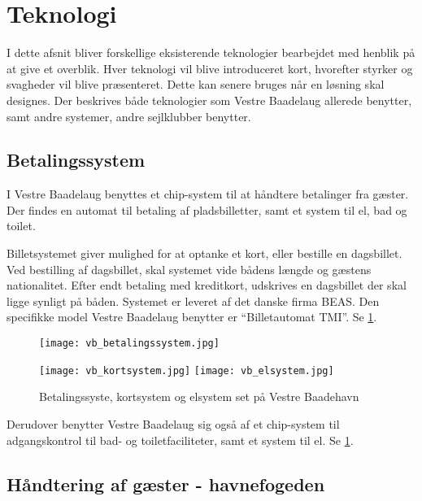 \section{Teknologi} %
\label{sec:Teknologi}

I dette afsnit bliver forskellige eksisterende teknologier bearbejdet med henblik på at give et overblik. Hver teknologi vil blive introduceret kort, hvorefter styrker og svagheder vil blive præsenteret. Dette kan senere bruges når en løsning skal designes. Der beskrives både teknologier som Vestre Baadelaug allerede benytter, samt andre systemer, andre sejlklubber benytter. 

\subsection{Betalingssystem} %
\label{sub:tek_betaling}

I Vestre Baadelaug benyttes et chip-system til at håndtere betalinger fra gæster. Der findes en automat til betaling af pladsbilletter, samt et system til el, bad og toilet.

Billetsystemet giver mulighed for at optanke et kort, eller bestille en dagsbillet. Ved bestilling af dagsbillet, skal systemet vide bådens længde og gæstens nationalitet. Efter endt betaling med kreditkort, udskrives en dagsbillet der skal ligge synligt på båden. Systemet er leveret af det danske firma BEAS. Den specifikke model Vestre Baadelaug benytter er \enquote{Billetautomat TMI}. Se \cref{fig:vb_systemer}.

\begin{figure}[h]
  \centering
  \begin{minipage}{0.45\textwidth}
    \texttt{[image: vb\_betalingssystem.jpg]}
  \end{minipage}
  \begin{minipage}{0.45\textwidth}
    \texttt{[image: vb\_kortsystem.jpg]}
    \texttt{[image: vb\_elsystem.jpg]}
  \end{minipage}
    \caption{Betalingssyste, kortsystem og elsystem set på Vestre Baadehavn}
    \label{fig:vb_systemer}
\end{figure}

Derudover benytter Vestre Baadelaug sig også af et chip-system til adgangskontrol til bad- og toiletfaciliteter, samt et system til el. Se \cref{fig:vb_systemer}.

\subsection{Håndtering af gæster - havnefogeden} %
\label{sub:gaster_havnefogeden}

